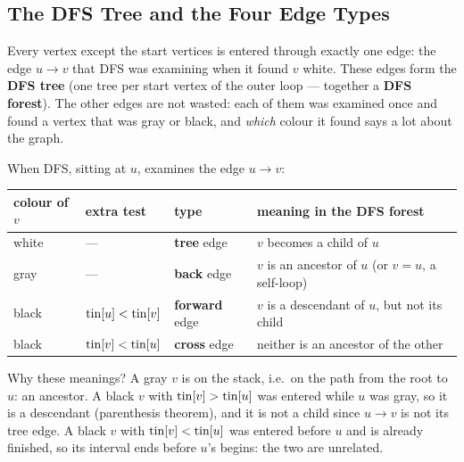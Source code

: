 \subsection{The DFS Tree and the Four Edge Types}
\label{ssec:ch2-dfs-tree}

Every vertex except the start vertices is entered through exactly one edge: the edge $u \to v$ that DFS was examining when it found $v$ white. These edges form the \textbf{DFS tree} (one tree per start vertex of the outer loop --- together a \textbf{DFS forest}). The other edges are not wasted: each of them was examined once and found a vertex that was gray or black, and \emph{which} colour it found says a lot about the graph.

\begin{definitionbox}
When DFS, sitting at $u$, examines the edge $u \to v$:
\begin{center}
\small
\renewcommand{\arraystretch}{1.3}
\begin{tabular}{@{}llll@{}}
\toprule
\textbf{colour of $v$} & \textbf{extra test} & \textbf{type} & \textbf{meaning in the DFS forest} \\
\midrule
white & --- & \textbf{tree} edge & $v$ becomes a child of $u$ \\
gray & --- & \textbf{back} edge & $v$ is an ancestor of $u$ (or $v = u$, a self-loop) \\
black & $\mathrm{tin}[u] < \mathrm{tin}[v]$ & \textbf{forward} edge & $v$ is a descendant of $u$, but not its child \\
black & $\mathrm{tin}[v] < \mathrm{tin}[u]$ & \textbf{cross} edge & neither is an ancestor of the other \\
\bottomrule
\end{tabular}
\end{center}
\end{definitionbox}

Why these meanings? A gray $v$ is on the stack, i.e.\ on the path from the root to $u$: an ancestor. A black $v$ with $\mathrm{tin}[v] > \mathrm{tin}[u]$ was entered while $u$ was gray, so it is a descendant (parenthesis theorem), and it is not a child since $u \to v$ is not its tree edge. A black $v$ with $\mathrm{tin}[v] < \mathrm{tin}[u]$ was entered before $u$ and is already finished, so its interval ends before $u$'s begins: the two are unrelated.

